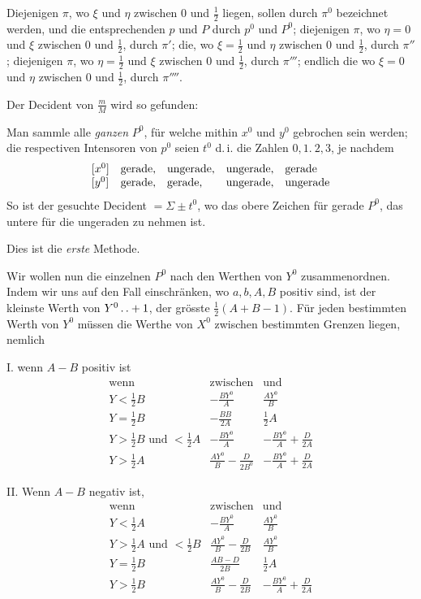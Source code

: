 Diejenigen $\pi$, wo $\xi$ und $\eta$ zwischen $0$ und $\frac12$ liegen, sollen durch $\pi^0$ bezeichnet werden, und die entsprechenden $p$ und $P$ durch $p^0$ und $P^0$; diejenigen $\pi$, wo $\eta=0$ und $\xi$ zwischen $0$ und $\frac12$, durch $\pi'$; die, wo $\xi=\frac12$ und $\eta$ zwischen $0$ und $\frac12$, durch $\pi''$; diejenigen $\pi$, wo $\eta=\frac12$ und $\xi$ zwischen $0$ und $\frac12$, durch $\pi'''$; endlich die wo $\xi=0$ und $\eta$ zwischen $0$ und $\frac12$, durch $\pi''''$.

Der Decident von $\frac{m}{M}$ wird so gefunden:

Man sammle alle \emph{ganzen} $P^0$, für welche mithin $x^0$ und $y^0$ gebrochen sein werden; die respectiven Intensoren von $p^0$ seien $t^0$ d.\,i. die Zahlen $0,1.\ 2,3$, je nachdem
\[
\begin{array}{lllll}
[x^0]&\text{gerade,}&\text{ungerade,}&\text{ungerade,}&\text{gerade}\\
\relax[y^0]&\text{gerade,}&\text{gerade,}&\text{ungerade,}&\text{ungerade}
\end{array}
\]
So ist der gesuchte Decident $=\Sigma\pm t^0$, wo das obere Zeichen für gerade $P^0$, das untere für die ungeraden zu nehmen ist.

Dies ist die \emph{erste} Methode.

Wir wollen nun die einzelnen $P^0$ nach den Werthen von $Y^0$ zusammenordnen. Indem wir uns auf den Fall einschränken, wo $a,b,A,B$ positiv sind, ist der kleinste Werth von $Y^0\mathinner{.\,.}+1$, der grösste $\frac12(A+B-1)$. Für jeden bestimmten Werth von $Y^0$ müssen die Werthe von $X^0$ zwischen bestimmten Grenzen liegen, nemlich

I. wenn $A-B$ positiv ist
\[
\begin{array}{c|c|c}
\text{wenn}&\text{zwischen}&\text{und}\\
Y<\frac12B&-\frac{BY^0}{A}&\frac{AY^0}{B}\\[5pt]
Y=\frac12B&-\frac{BB}{2A}&\frac12A\\[5pt]
Y>\frac12B\text{ und }<\frac12A&-\frac{BY^0}{A}&-\frac{BY^0}{A}+\frac{D}{2A}\\[5pt]
Y>\frac12A&\frac{AY^0}{B}-\frac{D}{2B^0}&-\frac{BY^0}{A}+\frac{D}{2A}
\end{array}
\]

%
II. Wenn $A-B$ negativ ist,
\[
\begin{array}{c|c|c}
\text{wenn}&\text{zwischen}&\text{und}\\
Y<\frac12A&-\frac{BY^0}{A}&\frac{AY^0}{B}\\[5pt]
Y>\frac12A\text{ und }<\frac12B&\frac{AY^0}{B}-\frac{D}{2B}&\frac{AY^0}{B}\\[5pt]
Y=\frac12B&\frac{AB-D}{2B}&\frac12A\\[5pt]
Y>\frac12B&\frac{AY^0}{B}-\frac{D}{2B}&-\frac{BY^0}{A}+\frac{D}{2A}
\end{array}
\]

